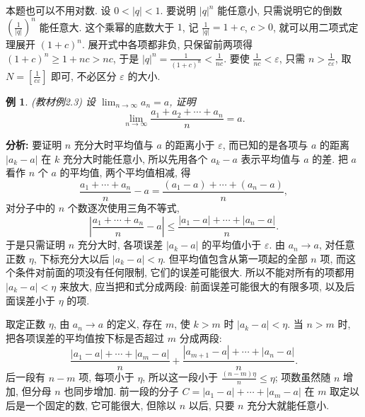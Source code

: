 \documentclass[UTF8,openany]{ctexbook}
\theoremstyle{chinesetextbook}
\newtheorem{example}{例}[section]
\begin{document}
本题也可以不用对数. 设 $0<|q|<1$. 要说明 $|q|^n$ 能任意小, 只需说明它的倒数 $\displaystyle\left(\frac1{|q|}\right)^n$ 能任意大. 这个乘幂的底数大于 $1$, 记 $\displaystyle\frac1{|q|}=1+c$, $c>0$, 就可以用二项式定理展开 $(1+c)^n$. 展开式中各项都非负, 只保留前两项得 $(1+c)^n\ge1+nc>nc$, 于是 $\displaystyle|q|^n=\frac1{(1+c)^n}<\frac1{nc}$. 要使 $\displaystyle\frac1{nc}<\varepsilon$, 只需 $\displaystyle n>\frac1{c\varepsilon}$, 取 $\displaystyle N=\left[\frac1{c\varepsilon}\right]$ 即可, 不必区分 $\varepsilon$ 的大小.


\begin{example}\label{ex:2-3}
\textnormal{(教材例2.3)} 设 $\displaystyle\lim_{n\to\infty}a_n=a$, 证明
\[
\lim_{n\to\infty}\frac{a_1+a_2+\cdots+a_n}n=a.
\]
\end{example}
\par\indent\textbf{分析:} 要证明 $n$ 充分大时平均值与 $a$ 的距离小于 $\varepsilon$, 而已知的是各项与 $a$ 的距离 $|a_k-a|$ 在 $k$ 充分大时能任意小, 所以先用各个 $a_k-a$ 表示平均值与 $a$ 的差. 把 $a$ 看作 $n$ 个 $a$ 的平均值, 两个平均值相减, 得
\[
\frac{a_1+\cdots+a_n}n-a=\frac{(a_1-a)+\cdots+(a_n-a)}n,
\]
对分子中的 $n$ 个数逐次使用三角不等式,
\[
\left|\frac{a_1+\cdots+a_n}n-a\right|\le\frac{|a_1-a|+\cdots+|a_n-a|}n.
\]
于是只需证明 $n$ 充分大时, 各项误差 $|a_k-a|$ 的平均值小于 $\varepsilon$. 由 $a_n\to a$, 对任意正数 $\eta$, 下标充分大以后 $|a_k-a|<\eta$. 但平均值包含从第一项起的全部 $n$ 项, 而这个条件对前面的项没有任何限制, 它们的误差可能很大. 所以不能对所有的项都用 $|a_k-a|<\eta$ 来放大, 应当把和式分成两段: 前面误差可能很大的有限多项, 以及后面误差小于 $\eta$ 的项.

取定正数 $\eta$, 由 $a_n\to a$ 的定义, 存在 $m$, 使 $k>m$ 时 $|a_k-a|<\eta$. 当 $n>m$ 时, 把各项误差的平均值按下标是否超过 $m$ 分成两段:
\[
\frac{|a_1-a|+\cdots+|a_m-a|}n+\frac{|a_{m+1}-a|+\cdots+|a_n-a|}n.
\]
后一段有 $n-m$ 项, 每项小于 $\eta$, 所以这一段小于 $\displaystyle\frac{(n-m)\eta}n\le\eta$; 项数虽然随 $n$ 增加, 但分母 $n$ 也同步增加. 前一段的分子 $C=|a_1-a|+\cdots+|a_m-a|$ 在 $m$ 取定以后是一个固定的数, 它可能很大, 但除以 $n$ 以后, 只要 $n$ 充分大就能任意小.
\end{document}
